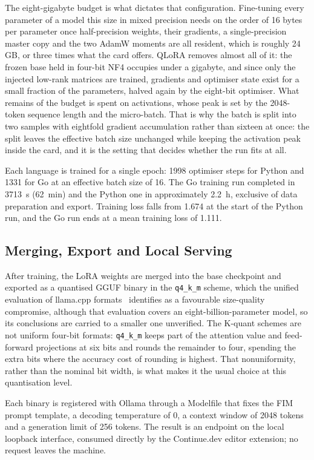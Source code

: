 \documentclass[10pt,conference,a4paper]{IEEEtran}
\begin{document}
The eight-gigabyte budget is what dictates that configuration. Fine-tuning
every parameter of a model this size in mixed precision needs on the order of
16 bytes per parameter once half-precision weights, their gradients, a
single-precision master copy and the two AdamW moments are all resident,
which is roughly 24\,GB, or three times what the card offers. QLoRA removes
almost all of it: the frozen base held in four-bit NF4 occupies under a
gigabyte, and since only the injected low-rank matrices are trained,
gradients and optimiser state exist for a small fraction of the parameters,
halved again by the eight-bit optimiser. What remains of the budget is spent
on activations, whose peak is set by the 2048-token sequence length and the
micro-batch. That is why the batch is split into two samples with eightfold
gradient accumulation rather than sixteen at once: the split leaves the
effective batch size unchanged while keeping the activation peak inside the
card, and it is the setting that decides whether the run fits at all.

Each language is trained for a single epoch: 1998 optimiser steps for Python
and 1331 for Go at an effective batch size of 16. The Go training run
completed in 3713~s (62~min) and the Python one in approximately 2.2~h,
exclusive of data preparation and export. Training loss falls from
1.674 at the start of the Python run, and the Go run ends at a mean training
loss of 1.111.

\subsection{Merging, Export and Local Serving}
After training, the LoRA weights are merged into the base checkpoint and
exported as a quantised GGUF binary in the \texttt{q4\_k\_m}
scheme, which the unified evaluation of llama.cpp
formats~\cite{kurt2026} identifies as a favourable size-quality compromise,
although that evaluation covers an eight-billion-parameter model, so its
conclusions are carried to a smaller one unverified. The K-quant schemes are not uniform four-bit formats: \texttt{q4\_k\_m}
keeps part of the attention value and feed-forward projections at six bits
and rounds the remainder to four, spending the extra bits where the accuracy
cost of rounding is highest. That nonuniformity, rather than the nominal bit
width, is what makes it the usual choice at this quantisation level.

Each binary is
registered with Ollama through a Modelfile that fixes the FIM prompt
template, a decoding temperature of 0, a context window of 2048 tokens and a
generation limit of 256 tokens. The result is an endpoint on the local
loopback interface, consumed directly by the Continue.dev editor extension;
no request leaves the machine.
\end{document}
